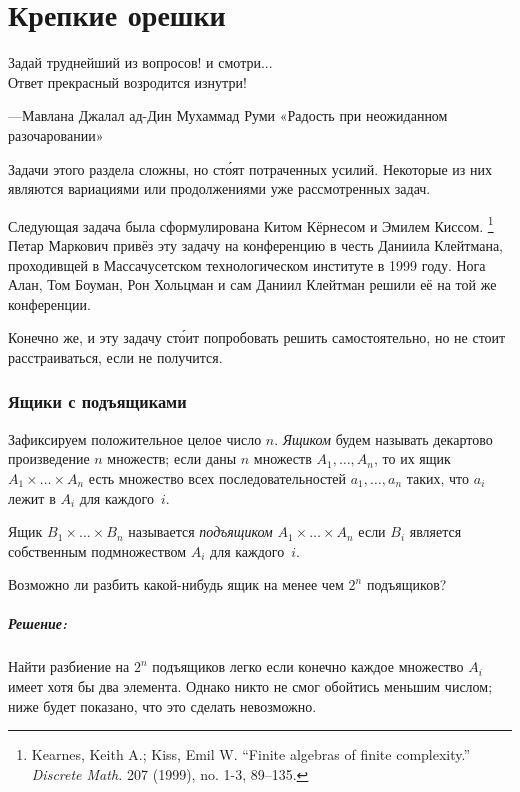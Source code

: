\chapter*{Крепкие орешки}

\setlength{\epigraphwidth}{.6\textwidth}
\epigraph{Задай  труднейший  из  вопросов!  и  смотри...\\
Ответ  прекрасный  возродится  изнутри!}{---Мавлана Джалал ад-Дин Мухаммад Руми «Радость   при   неожиданном разочаровании»
}

Задачи этого раздела сложны, но ст\'{о}ят потраченных усилий.
Некоторые из них являются вариациями или продолжениями уже рассмотренных задач.

\medskip

Следующая задача была сформулирована
Китом Кёрнесом %
и Эмилем Киссом.%
\footnote{Kearnes, Keith A.; Kiss, Emil W. ``Finite algebras of finite complexity.'' \emph{Discrete Math.} 207 (1999), no. 1-3, 89–135.}
Петар Маркович привёз эту задачу на конференцию в честь Даниила Клейтмана, проходивщей в Массачусетском технологическом институте в 1999 году.
Нога Алан, Том Боуман, Рон Хольцман и сам Даниил Клейтман решили её на той же конференции.

Конечно же, и эту задачу ст\'{о}ит попробовать решить самостоятельно, но не стоит расстраиваться, если не получится.

\subsection*{Ящики с подъящиками}

Зафиксируем положительное целое число $n$.
\emph{Ящиком} будем называть декартово произведение $n$ множеств;
если даны $n$ множеств $A_1,\dots,A_n$, то их ящик $A_1{\times}\dots{\times}A_n$ есть множество всех последовательностей $a_1,\dots,a_n$ таких,
что $a_i$ лежит в $A_i$ для каждого~$i$.

Ящик $B_1{\times}\dots{\times}B_n$ называется \emph{подъящиком} $A_1{\times}\dots{\times}A_n$ если $B_i$ является собственным подмножеством $A_i$ для каждого~$i$. %

Возможно ли разбить какой-нибудь ящик на менее чем $2^n$ подъящиков?

\paragraph{Решение:} Найти разбиение на $2^n$ подъящиков легко если конечно каждое множество $A_i$ имеет хотя бы два элемента.
Однако никто не смог обойтись меньшим числом; ниже будет показано, что это сделать невозможно.

